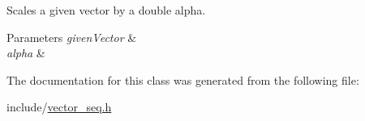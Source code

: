 Scales a given vector by a double \textquotesingle{}alpha\textquotesingle{}. 


\begin{DoxyParams}{Parameters}
{\em given\+Vector} & \\
\hline
{\em alpha} & \\
\hline
\end{DoxyParams}


The documentation for this class was generated from the following file\+:\begin{DoxyCompactItemize}
\item 
include/\mbox{\hyperlink{vector__seq_8h}{vector\+\_\+seq.\+h}}\end{DoxyCompactItemize}
